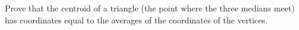Prove that the centroid of a triangle (the point where the three medians meet) has coordinates equal to the averages of the coordinates of the vertices.

